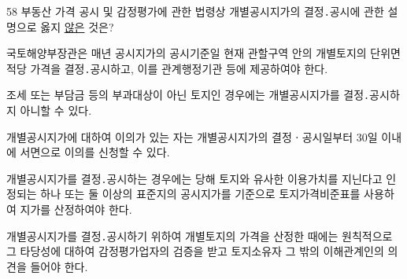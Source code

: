 \begin{question}{58}
부동산 가격 공시 및 감정평가에 관한 법령상 개별공시지가의 결정․공시에 관한 설명으로 옳지 \uline{않은} 것은?
\begin{choices}
  \item 국토해양부장관은 매년 공시지가의 공시기준일 현재 관할구역 안의 개별토지의 단위면적당 가격을 결정․공시하고, 이를 관계행정기관 등에 제공하여야 한다.
  \item 조세 또는 부담금 등의 부과대상이 아닌 토지인 경우에는 개별공시지가를 결정․공시하지 아니할 수 있다.
  \item 개별공시지가에 대하여 이의가 있는 자는 개별공시지가의 결정ㆍ공시일부터 30일 이내에 서면으로 이의를 신청할 수 있다.
  \item 개별공시지가를 결정․공시하는 경우에는 당해 토지와 유사한 이용가치를 지닌다고 인정되는 하나 또는 둘 이상의 표준지의 공시지가를 기준으로 토지가격비준표를 사용하여 지가를 산정하여야 한다.
  \item 개별공시지가를 결정․공시하기 위하여 개별토지의 가격을 산정한 때에는 원칙적으로 그 타당성에 대하여 감정평가업자의 검증을 받고 토지소유자 그 밖의 이해관계인의 의견을 들어야 한다.
\end{choices}
\end{question}
